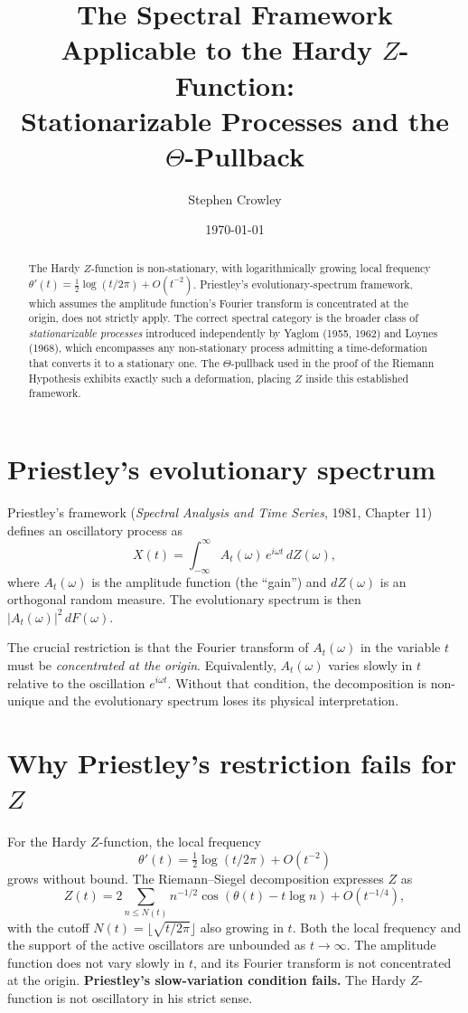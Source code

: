 \documentclass[11pt]{amsart}
\title{The Spectral Framework Applicable to the Hardy $Z$-Function:\\
Stationarizable Processes and the $\Theta$-Pullback}
\author{Stephen Crowley}
\date{\today}
\theoremstyle{plain}
\begin{document}
\maketitle

\begin{abstract}
The Hardy $Z$-function is non-stationary, with logarithmically growing local frequency $\theta'(t) = \tfrac{1}{2}\log(t/2\pi) + O(t^{-2})$. Priestley's evolutionary-spectrum framework, which assumes the amplitude function's Fourier transform is concentrated at the origin, does not strictly apply. The correct spectral category is the broader class of \emph{stationarizable processes} introduced independently by Yaglom (1955, 1962) and Loynes (1968), which encompasses any non-stationary process admitting a time-deformation that converts it to a stationary one. The $\Theta$-pullback used in the proof of the Riemann Hypothesis exhibits exactly such a deformation, placing $Z$ inside this established framework.
\end{abstract}

\section{Priestley's evolutionary spectrum}

Priestley's framework (\emph{Spectral Analysis and Time Series}, 1981, Chapter 11) defines an oscillatory process as
\[
X(t) = \int_{-\infty}^{\infty} A_t(\omega)\, e^{i\omega t}\, dZ(\omega),
\]
where $A_t(\omega)$ is the amplitude function (the ``gain'') and $dZ(\omega)$ is an orthogonal random measure. The evolutionary spectrum is then $|A_t(\omega)|^2\, dF(\omega)$.

The crucial restriction is that the Fourier transform of $A_t(\omega)$ in the variable $t$ must be \emph{concentrated at the origin}. Equivalently, $A_t(\omega)$ varies slowly in $t$ relative to the oscillation $e^{i\omega t}$. Without that condition, the decomposition is non-unique and the evolutionary spectrum loses its physical interpretation.

\section{Why Priestley's restriction fails for $Z$}

For the Hardy $Z$-function, the local frequency
\[
\theta'(t) = \tfrac{1}{2}\log(t/2\pi) + O(t^{-2})
\]
grows without bound. The Riemann--Siegel decomposition expresses $Z$ as
\[
Z(t) = 2\sum_{n \leq N(t)} n^{-1/2}\cos(\theta(t) - t\log n) + O(t^{-1/4}),
\]
with the cutoff $N(t) = \lfloor\sqrt{t/2\pi}\rfloor$ also growing in $t$. Both the local frequency and the support of the active oscillators are unbounded as $t \to \infty$. The amplitude function does not vary slowly in $t$, and its Fourier transform is not concentrated at the origin. \textbf{Priestley's slow-variation condition fails.} The Hardy $Z$-function is not oscillatory in his strict sense.
\end{document}

